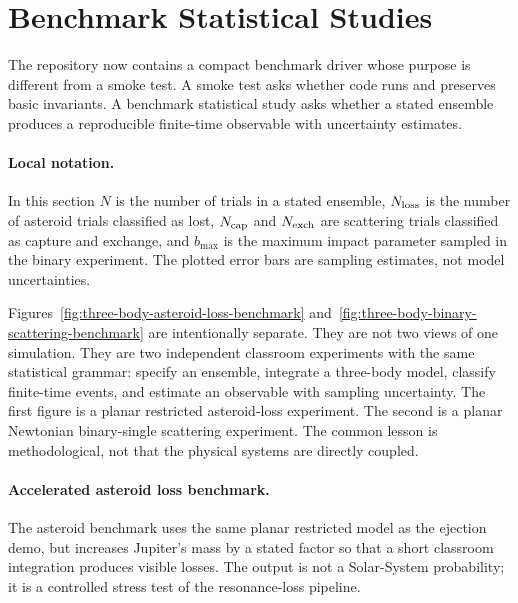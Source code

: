 \section{Benchmark Statistical Studies}
\label{sec:three-body-benchmark-statistics}

The repository now contains a compact benchmark driver whose purpose is
different from a smoke test.  A smoke test asks whether code runs and preserves
basic invariants.  A benchmark statistical study asks whether a stated ensemble
produces a reproducible finite-time observable with uncertainty estimates.

\paragraph{Local notation.}
In this section \(N\) is the number of trials in a stated ensemble,
\(N_{\rm loss}\) is the number of asteroid trials classified as lost,
\(N_{\rm cap}\) and \(N_{\rm exch}\) are scattering trials classified as
capture and exchange, and \(b_{\max}\) is the maximum impact parameter sampled
in the binary experiment.  The plotted error bars are sampling estimates, not
model uncertainties.

Figures~\ref{fig:three-body-asteroid-loss-benchmark}
and~\ref{fig:three-body-binary-scattering-benchmark} are intentionally
separate.  They are not two views of one simulation.  They are two independent
classroom experiments with the same statistical grammar: specify an ensemble,
integrate a three-body model, classify finite-time events, and estimate an
observable with sampling uncertainty.  The first figure is a planar restricted
asteroid-loss experiment.  The second is a planar Newtonian binary-single
scattering experiment.  The common lesson is methodological, not that the
physical systems are directly coupled.

\paragraph{Accelerated asteroid loss benchmark.}
The asteroid benchmark uses the same planar restricted model as the ejection
demo, but increases Jupiter's mass by a stated factor so that a short
classroom integration produces visible losses.  The output is not a
Solar-System probability; it is a controlled stress test of the resonance-loss
pipeline.


